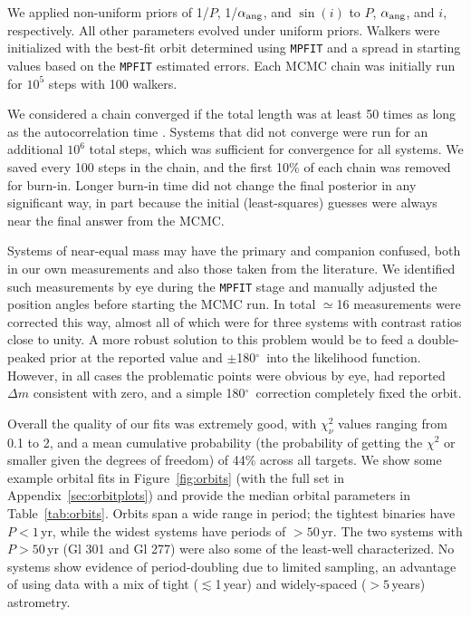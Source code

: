 \documentclass[twocolumn]{aastex62}
\newcommand{\degree}{$^{\circ}$}
\begin{document}
We applied non-uniform priors of 1/$P$, 1/$\alpha_{\rm{ang}}$, and $\sin(i)$ to $P$, $\alpha_{\rm{ang}}$, and $i$, respectively. All other parameters evolved under uniform priors. Walkers were initialized with the best-fit orbit determined using {\tt MPFIT} \citep{Markwart2009} and a spread in starting values based on the {\tt MPFIT} estimated errors. Each MCMC chain was initially run for $10^5$ steps with 100 walkers. 

We considered a chain converged if the total length was at least 50 times as long as the autocorrelation time \citep{2010CAMCS...5...65G}. Systems that did not converge were run for an additional $10^6$ total steps, which was sufficient for convergence for all systems. We saved every 100 steps in the chain, and the first 10\% of each chain was removed for burn-in. Longer burn-in time did not change the final posterior in any significant way, in part because the initial (least-squares) guesses were always near the final answer from the MCMC. 

Systems of near-equal mass may have the primary and companion confused, both in our own measurements and also those taken from the literature. We identified such measurements by eye during the {\tt MPFIT} stage and manually adjusted the position angles before starting the MCMC run. In total $\simeq$16 measurements were corrected this way, almost all of which were for three systems with contrast ratios close to unity. A more robust solution to this problem would be to feed a double-peaked prior at the reported value and $\pm$180\degree\ into the likelihood function. However, in all cases the problematic points were obvious by eye, had reported $\Delta m$ consistent with zero, and a simple 180\degree\ correction completely fixed the orbit. 

Overall the quality of our fits was extremely good, with $\chi^2_\nu$ values ranging from 0.1 to 2, and a mean cumulative probability (the probability of getting the $\chi^2$ or smaller given the degrees of freedom) of 44\% across all targets. We show some example orbital fits in Figure~\ref{fig:orbits} (with the full set in Appendix~\ref{sec:orbitplots}) and provide the median orbital parameters in Table~\ref{tab:orbits}. Orbits span a wide range in period; the tightest binaries have $P<1$\,yr, while the widest systems have periods of $>50$\,yr. The two systems with $P>50$\,yr (Gl 301 and Gl 277) were also some of the least-well characterized. No systems show evidence of period-doubling due to limited sampling, an advantage of using data with a mix of tight ($\lesssim$1\,year) and widely-spaced ($>5$\,years) astrometry.
\end{document}
